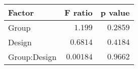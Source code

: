 \begin{tabular}{lrr}
\toprule
       Factor &   F ratio &  p value \\
\midrule
        Group &   $1.199$ & $0.2859$ \\
       Design &  $0.6814$ & $0.4184$ \\
 Group:Design & $0.00184$ & $0.9662$ \\
\bottomrule
\end{tabular}
